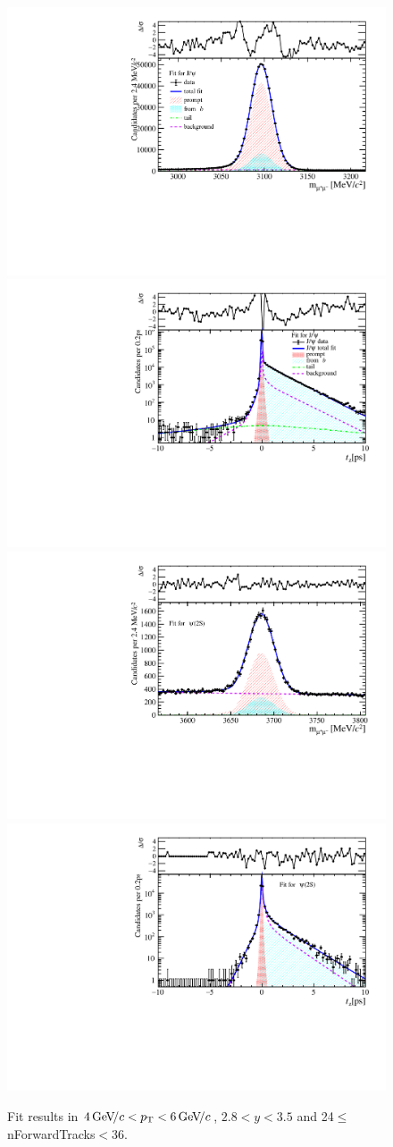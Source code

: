 \begin{figure}[H]
\begin{center}
\includegraphics[width=0.47\linewidth]{pdf/Jpsi/drawmassF/n3y2pt3.pdf}
\includegraphics[width=0.47\linewidth]{pdf/Jpsi/2DFitF/n3y2pt3.pdf}
\vspace*{-0.5cm}
\includegraphics[width=0.47\linewidth]{pdf/Psi2S/drawmassF/n3y2pt3.pdf}
\includegraphics[width=0.47\linewidth]{pdf/Psi2S/2DFitF/n3y2pt3.pdf}
\vspace*{-0.5cm}
\end{center}
\caption{Fit results in $4\text{\,Ge\kern -0.1em V\!/}c<p_{\mathrm{T}}<6\text{\,Ge\kern -0.1em V\!/}c$, $2.8<y<3.5$ and 24$\leq$nForwardTracks$<$36.}
\label{Fitn3y2pt3}
\end{figure}
